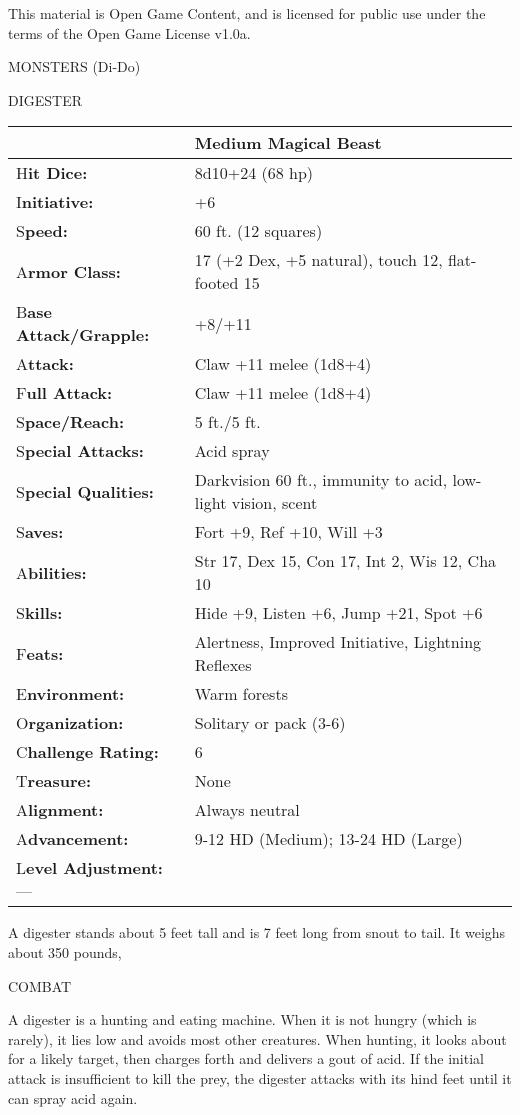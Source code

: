 \documentclass{article}
\begin{document}
This material is Open Game Content, and is licensed for public use under the terms 
of the Open Game License v1.0a.

{\LARGE{}MONSTERS (Di-Do)}

\vspace{12pt}
{\LARGE{}DIGESTER}

\begin{tabular}{|>{\raggedright}p{91pt}|>{\raggedright}p{234pt}|}
\hline
  & Medium Magical Beast\tabularnewline
\hline
H\textbf{it Dice:} & 8d10+24 (68 hp)\tabularnewline
\hline
I\textbf{nitiative:} & +6\tabularnewline
\hline
S\textbf{peed:} & 60 ft. (12 squares)\tabularnewline
\hline
A\textbf{rmor Class:} & 17 (+2 Dex, +5 natural), touch 12, flat-footed 15\tabularnewline
\hline
B\textbf{ase Attack/Grapple:} & +8/+11\tabularnewline
\hline
A\textbf{ttack:} & Claw +11 melee (1d8+4)\tabularnewline
\hline
F\textbf{ull Attack:} & Claw +11 melee (1d8+4)\tabularnewline
\hline
S\textbf{pace/Reach:} & 5 ft./5 ft.\tabularnewline
\hline
S\textbf{pecial Attacks:} & Acid spray\tabularnewline
\hline
S\textbf{pecial Qualities:} & Darkvision 60 ft., immunity to acid, low-light vision, 
scent\tabularnewline
\hline
S\textbf{aves:} & Fort +9, Ref +10, Will +3\tabularnewline
\hline
A\textbf{bilities:} & Str 17, Dex 15, Con 17, Int 2, Wis 12, Cha 10\tabularnewline
\hline
S\textbf{kills:} & Hide +9, Listen +6, Jump +21, Spot +6\tabularnewline
\hline
F\textbf{eats:} & Alertness, Improved Initiative, Lightning Reflexes\tabularnewline
\hline
E\textbf{nvironment:} & Warm forests\tabularnewline
\hline
O\textbf{rganization:} & Solitary or pack (3-6)\tabularnewline
\hline
C\textbf{hallenge Rating:} & 6\tabularnewline
\hline
T\textbf{reasure:} & None\tabularnewline
\hline
A\textbf{lignment:} & Always neutral\tabularnewline
\hline
A\textbf{dvancement:} & 9-12 HD (Medium); 13-24 HD (Large)\tabularnewline
\hline
L\textbf{evel Adjustment:}--- & \tabularnewline
\hline
\end{tabular}

A digester stands about 5 feet tall and is 7 feet long from snout to tail. It weighs 
about 350 pounds,

COMBAT

A digester is a hunting and eating machine. When it is not hungry (which is rarely), 
it lies low and avoids most other creatures. When hunting, it looks about for a 
likely target, then charges forth and delivers a gout of acid. If the initial attack 
is insufficient to kill the prey, the digester attacks with its hind feet until 
it can spray acid again.
\end{document}
